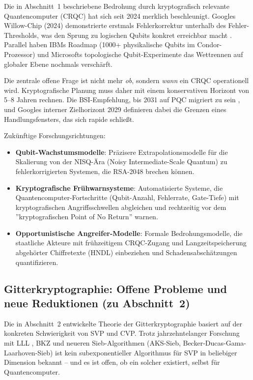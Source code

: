 ﻿\documentclass[a4paper,12pt]{article}
\theoremstyle{definition}
\begin{document}
Die in Abschnitt~1 beschriebene Bedrohung durch kryptografisch relevante
Quantencomputer (CRQC) hat sich seit 2024 merklich beschleunigt.
Googles Willow-Chip (2024) demonstrierte erstmals Fehlerkorrektur
unterhalb des Fehler-Thresholds, was den Sprung zu logischen Qubits
konkret erreichbar macht \cite{Goo26,Hei26}.
Parallel haben IBMs Roadmap (1000+ physikalische Qubits im
Condor-Prozessor) und Microsofts topologische Qubit-Experimente
das Wettrennen auf globaler Ebene nochmals verschärft.

Die zentrale offene Frage ist nicht mehr \emph{ob}, sondern \emph{wann}
ein CRQC operationell wird. Kryptografische Planung muss daher mit
einem konservativen Horizont von 5--8 Jahren rechnen.
Die BSI-Empfehlung, bis 2031 auf PQC migriert zu sein \cite{BSI24},
und Googles interner Zielhorizont 2029 \cite{Goo26} definieren dabei
die Grenzen eines Handlungsfensters, das sich rapide schließt.

Zukünftige Forschungsrichtungen:
\begin{itemize}
  \item \textbf{Qubit-Wachstumsmodelle}: Präzisere Extrapolationsmodelle
    für die Skalierung von der NISQ-Ära (Noisy Intermediate-Scale Quantum)
    zu fehlerkorrigierten Systemen, die RSA-2048 brechen können.
  \item \textbf{Kryptografische Frühwarnsysteme}: Automatisierte Systeme,
    die Quantencompu\-ter-Fortschritte (Qubit-Anzahl, Fehlerrate, Gate-Tiefe)
    mit kryptografischen Angriffsschwellen abgleichen und rechtzeitig
    vor dem ''kryptografischen Point of No Return'' warnen.
  \item \textbf{Opportunistische Angreifer-Modelle}: Formale Bedrohungsmodelle,
    die staatliche Akteure mit frühzeitigem CRQC-Zugang und
    Langzeitspeicherung abgehörter Chiffretexte (HNDL) einbeziehen
    und Schadensabschätzungen quantifizieren.
\end{itemize}

\subsection{Gitterkryptographie: Offene Probleme und neue Reduktionen (zu Abschnitt~2)}

Die in Abschnitt~2 entwickelte Theorie der Gitterkryptographie basiert
auf der konkreten Schwierigkeit von SVP und CVP. Trotz jahrzehntelanger
Forschung mit LLL \cite{LLL82}, BKZ und neueren Sieb-Algorithmen
(AKS-Sieb, Becker-Ducas-Gama-Laarhoven-Sieb) ist kein subexponentieller
Algorithmus für SVP in beliebiger Dimension bekannt -- und es ist offen,
ob ein solcher existiert, selbst für Quantencomputer.
\end{document}
